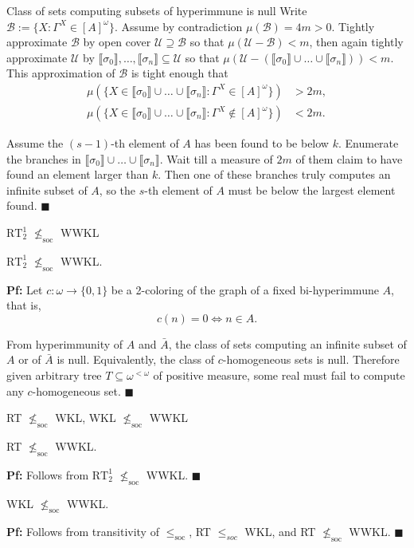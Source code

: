 \begin{frame}{Class of sets computing subsets of hyperimmune is null}
  Write $\mathcal{B} :=\{X: \Gamma^X\in[A]^\omega\}$.
  Assume by contradiction $\mu(\mathcal{B})=4m>0$. Tightly approximate
  $\mathcal{B}$ by open cover $\mathcal{U}\supseteq\mathcal{B}$ so that
  $\mu(\mathcal{U}-\mathcal{B})<m$, then again tightly approximate
  $\mathcal{U}$ by $\llbracket\sigma_0\rrbracket,
  \ldots,\llbracket\sigma_n\rrbracket \subseteq\mathcal{U}$ so
  that $\mu(\mathcal{U}-(\llbracket\sigma_0\rrbracket \cup\ldots
  \cup\llbracket\sigma_n\rrbracket)) <m$. This approximation of
  $\mathcal{B}$ is tight enough that
  \begin{align*}
    \mu(\{X\in\llbracket\sigma_0\rrbracket \cup\ldots\cup
    \llbracket\sigma_n\rrbracket: \Gamma^X\in[A]^\omega\}) &>2m,\\
    \mu(\{X\in\llbracket\sigma_0\rrbracket \cup\ldots\cup
    \llbracket\sigma_n\rrbracket: \Gamma^X\not\in[A]^\omega\}) &<2m.
  \end{align*}

  Assume the $(s-1)$-th element of $A$ has been found to be below $k$.
  Enumerate the branches in $\llbracket\sigma_0\rrbracket \cup\ldots\cup
  \llbracket\sigma_n\rrbracket$.  Wait
  till a measure of $2m$ of them claim to have found an element larger than
  $k$. Then one of these branches truly computes an infinite subset of
  $A$, so the $s$-th element of $A$ must be below the largest element
  found. $\blacksquare$
\end{frame}

\begin{frame}{$\text{RT}_2^1$ $\nleq_{\text{soc}}$ WWKL}
  \begin{thm}
    $\text{RT}_2^1$ $\nleq_{\text{soc}}$ WWKL.
  \end{thm}

  \vspace{1em}
  \textbf{Pf:} Let $c:\omega\rightarrow\{0,1\}$ be a 2-coloring of the
  graph of a fixed bi-hyperimmune $A$, that is,
  \[c(n)=0 \Leftrightarrow n\in A.\]
  
  From hyperimmunity of $A$ and $\bar{A}$, the class of sets computing an
  infinite subset of $A$ or of $\bar{A}$ is null. Equivalently, the class
  of $c$-homogeneous sets is null. Therefore given arbitrary tree
  $T\subseteq\omega^{<\omega}$ of positive measure, some real must fail to
  compute any $c$-homogeneous set. $\blacksquare$
\end{frame}

\begin{frame}{RT $\nleq_{\text{soc}}$ WKL, WKL $\nleq_{\text{soc}}$ WWKL}
  \begin{coro}
    \label{coro:rt-wwkl}
    RT $\nleq_{\text{soc}}$ WWKL.
  \end{coro}
  \textbf{Pf:} Follows from $\text{RT}_2^1$ $\nleq_{\text{soc}}$ WWKL.
  $\blacksquare$

  \vspace{2em}
  \begin{coro}
    WKL $\nleq_{\text{soc}}$ WWKL.
  \end{coro}
  \textbf{Pf:} Follows from transitivity of $\leq_\text{soc}$,
  RT $\leq_{soc}$ WKL, and RT $\nleq_{\text{soc}}$ WWKL. $\blacksquare$
\end{frame}
